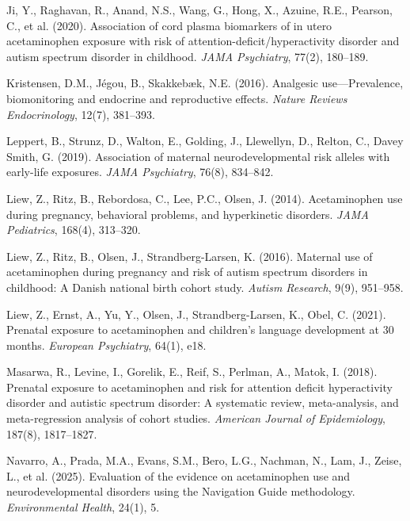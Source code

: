 \documentclass[12pt]{article}
\begin{document}
\begin{thebibliography}{99}
Ji, Y., Raghavan, R., Anand, N.S., Wang, G., Hong, X., Azuine, R.E., Pearson, C., et al. (2020).
Association of cord plasma biomarkers of in utero acetaminophen exposure with risk of attention-deficit/hyperactivity disorder and autism spectrum disorder in childhood.
\textit{JAMA Psychiatry}, 77(2), 180--189.

Kristensen, D.M., Jégou, B., Skakkebæk, N.E. (2016).
Analgesic use---Prevalence, biomonitoring and endocrine and reproductive effects.
\textit{Nature Reviews Endocrinology}, 12(7), 381--393.

Leppert, B., Strunz, D., Walton, E., Golding, J., Llewellyn, D., Relton, C., Davey Smith, G. (2019).
Association of maternal neurodevelopmental risk alleles with early-life exposures.
\textit{JAMA Psychiatry}, 76(8), 834--842.

Liew, Z., Ritz, B., Rebordosa, C., Lee, P.C., Olsen, J. (2014).
Acetaminophen use during pregnancy, behavioral problems, and hyperkinetic disorders.
\textit{JAMA Pediatrics}, 168(4), 313--320.

Liew, Z., Ritz, B., Olsen, J., Strandberg-Larsen, K. (2016).
Maternal use of acetaminophen during pregnancy and risk of autism spectrum disorders in childhood: A Danish national birth cohort study.
\textit{Autism Research}, 9(9), 951--958.

Liew, Z., Ernst, A., Yu, Y., Olsen, J., Strandberg-Larsen, K., Obel, C. (2021).
Prenatal exposure to acetaminophen and children's language development at 30 months.
\textit{European Psychiatry}, 64(1), e18.

Masarwa, R., Levine, I., Gorelik, E., Reif, S., Perlman, A., Matok, I. (2018).
Prenatal exposure to acetaminophen and risk for attention deficit hyperactivity disorder and autistic spectrum disorder: A systematic review, meta-analysis, and meta-regression analysis of cohort studies.
\textit{American Journal of Epidemiology}, 187(8), 1817--1827.

Navarro, A., Prada, M.A., Evans, S.M., Bero, L.G., Nachman, N., Lam, J., Zeise, L., et al. (2025).
Evaluation of the evidence on acetaminophen use and neurodevelopmental disorders using the Navigation Guide methodology.
\textit{Environmental Health}, 24(1), 5.


\end{thebibliography}
\end{document}
